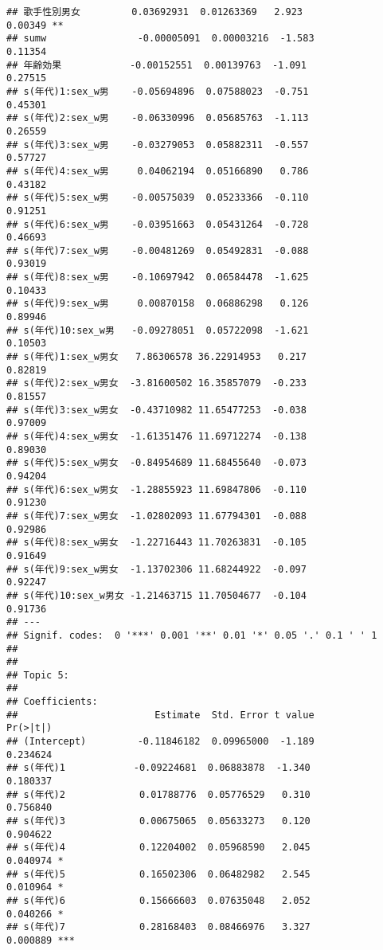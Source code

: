 \documentclass[
]{article}
\begin{document}
\begin{verbatim}
## 歌手性別男女         0.03692931  0.01263369   2.923              0.00349 ** 
## sumw                -0.00005091  0.00003216  -1.583              0.11354    
## 年齢効果            -0.00152551  0.00139763  -1.091              0.27515    
## s(年代)1:sex_w男    -0.05694896  0.07588023  -0.751              0.45301    
## s(年代)2:sex_w男    -0.06330996  0.05685763  -1.113              0.26559    
## s(年代)3:sex_w男    -0.03279053  0.05882311  -0.557              0.57727    
## s(年代)4:sex_w男     0.04062194  0.05166890   0.786              0.43182    
## s(年代)5:sex_w男    -0.00575039  0.05233366  -0.110              0.91251    
## s(年代)6:sex_w男    -0.03951663  0.05431264  -0.728              0.46693    
## s(年代)7:sex_w男    -0.00481269  0.05492831  -0.088              0.93019    
## s(年代)8:sex_w男    -0.10697942  0.06584478  -1.625              0.10433    
## s(年代)9:sex_w男     0.00870158  0.06886298   0.126              0.89946    
## s(年代)10:sex_w男   -0.09278051  0.05722098  -1.621              0.10503    
## s(年代)1:sex_w男女   7.86306578 36.22914953   0.217              0.82819    
## s(年代)2:sex_w男女  -3.81600502 16.35857079  -0.233              0.81557    
## s(年代)3:sex_w男女  -0.43710982 11.65477253  -0.038              0.97009    
## s(年代)4:sex_w男女  -1.61351476 11.69712274  -0.138              0.89030    
## s(年代)5:sex_w男女  -0.84954689 11.68455640  -0.073              0.94204    
## s(年代)6:sex_w男女  -1.28855923 11.69847806  -0.110              0.91230    
## s(年代)7:sex_w男女  -1.02802093 11.67794301  -0.088              0.92986    
## s(年代)8:sex_w男女  -1.22716443 11.70263831  -0.105              0.91649    
## s(年代)9:sex_w男女  -1.13702306 11.68244922  -0.097              0.92247    
## s(年代)10:sex_w男女 -1.21463715 11.70504677  -0.104              0.91736    
## ---
## Signif. codes:  0 '***' 0.001 '**' 0.01 '*' 0.05 '.' 0.1 ' ' 1
## 
## 
## Topic 5:
## 
## Coefficients:
##                        Estimate  Std. Error t value             Pr(>|t|)    
## (Intercept)         -0.11846182  0.09965000  -1.189             0.234624    
## s(年代)1            -0.09224681  0.06883878  -1.340             0.180337    
## s(年代)2             0.01788776  0.05776529   0.310             0.756840    
## s(年代)3             0.00675065  0.05633273   0.120             0.904622    
## s(年代)4             0.12204002  0.05968590   2.045             0.040974 *  
## s(年代)5             0.16502306  0.06482982   2.545             0.010964 *  
## s(年代)6             0.15666603  0.07635048   2.052             0.040266 *  
## s(年代)7             0.28168403  0.08466976   3.327             0.000889 ***

\end{verbatim}
\end{document}
